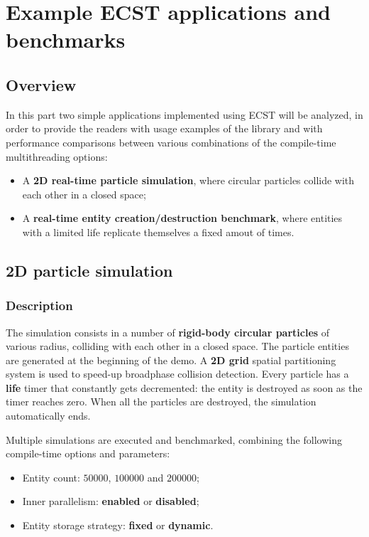 \documentclass[oneside, 12pt, a4paper, openany]{book}
\begin{document}
\part{Example ECST applications and benchmarks}

\hypertarget{part3_sim}{\chapter{Overview}\label{part3_sim}}

In this part two simple applications implemented using ECST will be
analyzed, in order to provide the readers with usage examples of the
library and with performance comparisons between various combinations of
the compile-time multithreading options:

\begin{itemize}
\item
  A \textbf{2D real-time particle simulation}, where circular particles
  collide with each other in a closed space;
\item
  A \textbf{real-time entity creation/destruction benchmark}, where
  entities with a limited life replicate themselves a fixed amout of
  times.
\end{itemize}

\chapter{2D particle simulation}\label{d-particle-simulation}

\section{Description}\label{description}

The simulation consists in a number of \textbf{rigid-body circular
particles} of various radius, colliding with each other in a closed
space. The particle entities are generated at the beginning of the demo.
A \textbf{2D grid} spatial partitioning system is used to speed-up
broadphase collision detection. Every particle has a \textbf{life} timer
that constantly gets decremented: the entity is destroyed as soon as the
timer reaches zero. When all the particles are destroyed, the simulation
automatically ends.

Multiple simulations are executed and benchmarked, combining the
following compile-time options and parameters:

\begin{itemize}
\item
  Entity count: \(50000\), \(100000\) and \(200000\);
\item
  Inner parallelism: \textbf{enabled} or \textbf{disabled};
\item
  Entity storage strategy: \textbf{fixed} or \textbf{dynamic}.
\end{itemize}
\end{document}
